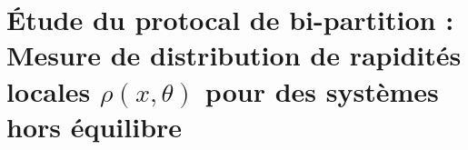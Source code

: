 

\chapter{Étude du protocal de bi-partition : Mesure de distribution de rapidités locales $\rho(x , \theta ) $  pour des systèmes hors équilibre}




			            
